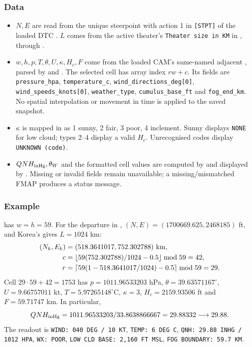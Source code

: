 \documentclass[10pt,a4paper]{amsart}
\begin{document}
\subsubsection*{Data}
\begin{itemize}
\setlength{\itemsep}{0pt}
\setlength{\parsep}{0pt}
\item $N,E$ are read from the unique steerpoint with action 1 in
\texttt{[STPT]} of the loaded DTC .
$L$ comes from the active theater's
\texttt{Theater size in KM} in ,
through .
\item $w,h,p,T,\theta,U,\kappa,H_c,F$ come from the loaded CAM's
same-named adjacent , parsed by
 and
.
The selected cell has array index $rw+c$. Its fields are
\texttt{pressure\_hpa}, \texttt{temperature\_c},
\texttt{wind\_directions\_deg[0]}, \texttt{wind\_speeds\_knots[0]},
\texttt{weather\_type}, \texttt{cumulus\_base\_ft} and
\texttt{fog\_end\_km}. No spatial interpolation or movement in time
is applied to the saved snapshot.
\item $\kappa$ is mapped in  as
1 sunny, 2 fair, 3 poor, 4 inclement. Sunny displays
\texttt{NONE} for low cloud; types 2--4 display a valid $H_c$.
Unrecognised codes display \texttt{UNKNOWN (code)}.
\item $QNH_{\rm inHg},\theta_W$ and the formatted cell values are
computed by  and displayed
by . Missing or invalid fields remain
unavailable; a missing/mismatched FMAP produces a status message.
\end{itemize}

\subsubsection*{Example}
 has $w=h=59$.
For the departure in ,
$(N,E)=(1700669.625,2468185)$ ft, and Korea's
 gives $L=1024$ km:
\begin{align*}
 (N_k,E_k)&=(518.3641017,752.302788)\ {\rm km},\\
 c&=\lfloor59(752.302788)/1024-0.5\rfloor\bmod59=42,\\
 r&=\lceil59(1-518.3641017/1024)-0.5\rceil\bmod59=29.
\end{align*}
Cell $29\cdot59+42=1753$ has
$p=1011.96533203$ hPa, $\theta=39.63571167^\circ$,
$U=9.66757011$ kt, $T=5.97265148^\circ$C, $\kappa=3$,
$H_c=2159.93506$ ft and $F=59.71747$ km. In particular,
\[
 QNH_{\rm inHg}=1011.96533203/33.8638866667
              =29.88332\longrightarrow29.88.
\]
The readout is \texttt{WIND: 040 DEG / 10 KT},
\texttt{TEMP: 6 DEG C}, \texttt{QNH: 29.88 INHG / 1012 HPA},
\texttt{WX: POOR}, \texttt{LOW CLD BASE: 2,160 FT MSL},
\texttt{FOG BOUNDARY: 59.7 KM}.
\end{document}
